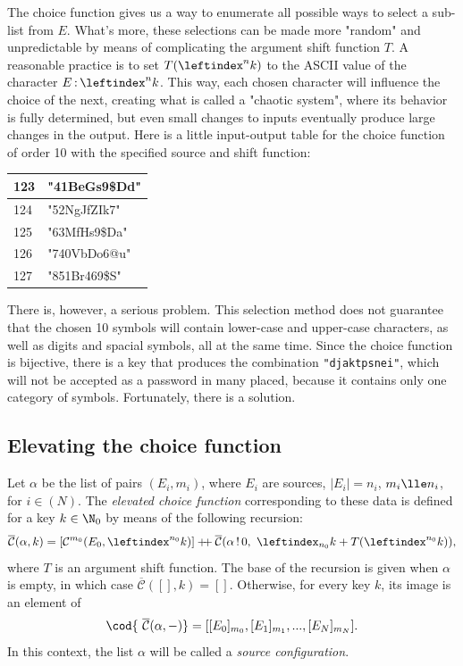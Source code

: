 \documentclass[12pt, a4paper]{article}
\renewcommand{\C}{\mathcal{C}}
\newcommand{\CC}{\overline{\mathcal{C}}}
\newcommand{\dop}{\mathbin{{+}\hspace{-1mm}{+}}}
\newcommand{\lli}[1]{\leftindex_{#1}}
\newcommand{\lui}[1]{\leftindex^{#1}}
\newcommand{\elt}{\mathop{:}}
\newcommand{\wo}{\mathop{!}}
\begin{document}
The choice function gives us a way to enumerate all possible ways to select a sub-list from $ E $. What's more, these selections can be made more "random" and unpredictable by means of complicating the argument shift function $ T $. A reasonable practice is to set $ T(\lui{n}k) $ to the ASCII value of the character $ E \elt \lui{n}k $. This way, each chosen character will influence the choice of the next, creating what is called a "chaotic system", where its behavior is fully determined, but even small changes to inputs eventually produce large changes in the output. Here is a little input-output table for the choice function of order 10 with the specified source and shift function:

\def\arraystretch{1.3}
\begin{center}
\begin{tabular}{l|l}
    123 & \ttfamily"41BeGs9\$Dd"\\
    \hline
    124 & \ttfamily"52NgJfZIk7"\\
    \hline
    125 & \ttfamily"63MfHs9\$Da"\\
    \hline
    126 & \ttfamily"740VbDo6@u"\\
    \hline
    127 & \ttfamily"851Br469\$S"\\
\end{tabular}
\end{center}

There is, however, a serious problem. This selection method does not guarantee that the chosen 10 symbols will contain lower-case and upper-case characters, as well as digits and spacial symbols, all at the same time. Since the choice function is bijective, there is a key that produces the combination \texttt{"djaktpsnei"}, which will not be accepted as a password in many placed, because it contains only one category of symbols. Fortunately, there is a solution.

\subsection{Elevating the choice function}

\begin{definition}
    Let $ \alpha $ be the list of pairs $ (E_i, m_i) $, where $ E_i $ are sources, $ |E_i| = n_i $, $ m_i \lle n_i $, for $ i \in (N) $. The \emph{elevated choice function} corresponding to these data is defined for a key $ k \in \N_0 $ by means of the following recursion:
    \[ \CC(\alpha, k) = [\C^{m_0}(E_0, \lui{n_0}k)] \dop \CC(\alpha \wo 0,\ \lli{n_0}k + T(\lui{n_0}k)), \]
    where $ T $ is an argument shift function. The base of the recursion is given when $ \alpha $ is empty, in which case $ \CC([], k) = [] $. Otherwise, for every key $ k $, its image is an element of
    \[ \cod{\ \CC(\alpha, -)} = [[E_0]_{m_0}, [E_1]_{m_1}, ..., [E_N]_{m_N}]. \]
    In this context, the list $ \alpha $ will be called a \emph{source configuration}.
\end{definition}
\end{document}
